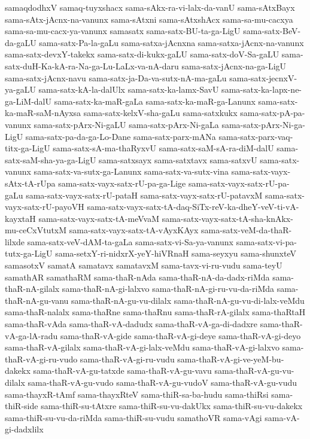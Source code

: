 {samaqdodhxV
samaq-tuyxshacx
sama-sAkx-ra-vi-lalx-da-vanU
sama-sAtxBayx
sama-sAtx-jAcnx-na-vanunx
sama-sAtxni
sama-sAtxshAcx
sama-sa-mu-cacxya
sama-sa-mu-cacx-ya-vanunx
samasatx
sama-satx-BU-ta-ga-LigU
sama-satx-BeV-da-gaLU
sama-satx-Pa-la-gaLu
sama-satxa-jAcnxna
sama-satxa-jAcnx-na-vanunx
sama-satx-devxY-takekx
sama-satx-di-kukx-gaLU
sama-satx-doV-Sa-gaLU
sama-satx-duH-Ka-kA-ra-Na-ga-Lu-LaLx-va-nA-daru
sama-satx-jAcnx-na-ga-LigU
sama-satx-jAcnx-navu
sama-satx-ja-Da-va-sutx-nA-ma-gaLu
sama-satx-jecnxV-ya-gaLU
sama-satx-kA-la-dalUlx
sama-satx-ka-lamx-SavU
sama-satx-ka-lapx-ne-ga-LiM-dalU
sama-satx-ka-maR-gaLa
sama-satx-ka-maR-ga-Lanunx
sama-satx-ka-maR-saM-nAyxsa
sama-satx-kelxV-sha-gaLu
sama-satxkukx
sama-satx-pA-pa-vanunx
sama-satx-pArx-Ni-gaLU
sama-satx-pArx-Ni-gaLa
sama-satx-pArx-Ni-ga-LigU
sama-satx-pa-da-ga-Lo-Dane
sama-satx-parx-mANa
sama-satx-parx-vaq-titx-ga-LigU
sama-satx-sA-ma-thaRyxvU
sama-satx-saM-sA-ra-diM-dalU
sama-satx-saM-sha-ya-ga-LigU
sama-satxsayx
sama-satxtavx
sama-satxvU
sama-satx-vanunx
sama-satx-va-sutx-ga-Lanunx
sama-satx-va-sutx-vina
sama-satx-vayx-sAtx-tA-rUpa
sama-satx-vayx-satx-rU-pa-ga-Lige
sama-satx-vayx-satx-rU-pa-gaLu
sama-satx-vayx-satx-rU-pataH
sama-satx-vayx-satx-rU-patavxM
sama-satx-vayx-satx-rU-payoVH
sama-satx-vayx-satx-tA-daq-SiTx-reV-ka-dheY-veV-ti-vA-kayxtaH
sama-satx-vayx-satx-tA-meVvaM
sama-satx-vayx-satx-tA-sha-knAkx-mu-ceCxVtutxM
sama-satx-vayx-satx-tA-vAyxKAyx
sama-satx-veM-da-thaR-lilxde
sama-satx-veV-dAM-ta-gaLa
sama-satx-vi-Sa-ya-vanunx
sama-satx-vi-pa-tutx-ga-LigU
sama-setxY-ri-nidxrX-yeY-hiVRnaH
sama-seyxyu
sama-shunxteV
samasotxV
samatA
samatavx
samatavxM
sama-tavx-vi-ru-vudu
sama-teyU
samathAR
samathaRM
sama-thaR-nAda
sama-thaR-nA-da-dadx-riMda
sama-thaR-nA-gilalx
sama-thaR-nA-gi-lalxvo
sama-thaR-nA-gi-ru-vu-da-riMda
sama-thaR-nA-gu-vanu
sama-thaR-nA-gu-vu-dilalx
sama-thaR-nA-gu-vu-di-lalx-veMdu
sama-thaR-nalalx
sama-thaRne
sama-thaRnu
sama-thaR-rA-gilalx
sama-thaRtaH
sama-thaR-vAda
sama-thaR-vA-dadudx
sama-thaR-vA-ga-di-dadxre
sama-thaR-vA-ga-lA-radu
sama-thaR-vA-gide
sama-thaR-vA-gi-deye
sama-thaR-vA-gi-deyo
sama-thaR-vA-gilalx
sama-thaR-vA-gi-lalx-veMdu
sama-thaR-vA-gi-lalxvo
sama-thaR-vA-gi-ru-vudo
sama-thaR-vA-gi-ru-vudu
sama-thaR-vA-gi-ve-yeM-bu-dakekx
sama-thaR-vA-gu-tatxde
sama-thaR-vA-gu-vavu
sama-thaR-vA-gu-vu-dilalx
sama-thaR-vA-gu-vudo
sama-thaR-vA-gu-vudoV
sama-thaR-vA-gu-vudu
sama-thayxR-tAmf
sama-thayxRteV
sama-thiR-sa-ba-hudu
sama-thiRsi
sama-thiR-side
sama-thiR-su-tAtxre
sama-thiR-su-vu-dakUkx
sama-thiR-su-vu-dakekx
sama-thiR-su-vu-da-riMda
sama-thiR-su-vudu
samathoVR
sama-vAgi
sama-vA-gi-dadxlilx
}
